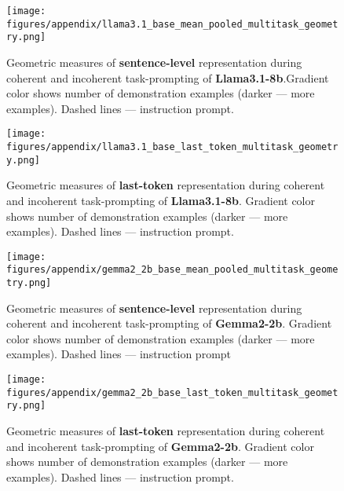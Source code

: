 \begin{figure*}[h!]
    \centering
    \texttt{[image: figures/appendix/llama3.1\_base\_mean\_pooled\_multitask\_geometry.png]}
    \caption{Geometric measures of \textbf{sentence-level} representation during coherent and incoherent task-prompting of \textbf{Llama3.1-8b}.Gradient color shows number of demonstration examples (darker --- more examples). Dashed lines --- instruction prompt.}
    \label{fig:multitask_extended_sentence}
\end{figure*}

\begin{figure*}[h!]
    \centering
    \texttt{[image: figures/appendix/llama3.1\_base\_last\_token\_multitask\_geometry.png]}
    \caption{Geometric measures of \textbf{last-token} representation during coherent and incoherent task-prompting of \textbf{Llama3.1-8b}. Gradient color shows number of demonstration examples (darker --- more examples). Dashed lines --- instruction prompt.}
    \label{fig:multitask_extended_last_token}
\end{figure*}


\begin{figure*}[h!]
    \centering
    \texttt{[image: figures/appendix/gemma2\_2b\_base\_mean\_pooled\_multitask\_geometry.png]}
    \caption{Geometric measures of \textbf{sentence-level} representation during coherent and incoherent task-prompting of \textbf{Gemma2-2b}. Gradient color shows number of demonstration examples (darker --- more examples). Dashed lines --- instruction prompt}
\end{figure*}

\begin{figure*}[h!]
    \centering
    \texttt{[image: figures/appendix/gemma2\_2b\_base\_last\_token\_multitask\_geometry.png]}
    \caption{Geometric measures of \textbf{last-token} representation during coherent and incoherent task-prompting of \textbf{Gemma2-2b}. Gradient color shows number of demonstration examples (darker --- more examples). Dashed lines --- instruction prompt.}
\end{figure*}